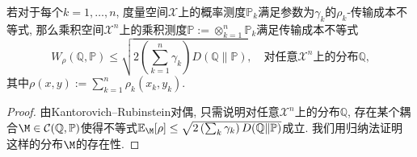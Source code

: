 \begin{proposition}[传输成本不等式的张量化]\label{thm:TensorizationForTransportationCost}
	若对于每个$k = 1, \dots, n$, 度量空间$\mathcal{X}$上的概率测度$\mathbb{P}_k$满足参数为$\gamma_k$的$\rho_k$-传输成本不等式, 那么乘积空间$\mathcal{X}^n$上的乘积测度$\mathbb{P} := \otimes_{k=1}^n \mathbb{P}_k$满足传输成本不等式
	\begin{equation}
		W_{\rho}(\mathbb{Q}, \mathbb{P})
		\leq \sqrt{2 \left(\sum_{k=1}^n \gamma_k \right) D(\mathbb{Q} \| \mathbb{P})}, \quad \text{对任意$\mathcal{X}^n$上的分布$\mathbb{Q}$,}
	\end{equation}
	其中$\rho(x, y) := \sum_{k=1}^n \rho_k(x_k, y_k)$. 
\end{proposition}
\begin{proof}
	由Kantorovich–Rubinstein对偶, 只需说明对任意$\mathcal{X}^n$上的分布$\mathbb{Q}$, 存在某个耦合$\M \in \mathcal{C}(\mathbb{Q}, \mathbb{P})$使得不等式$\mathbb{E}_{\M}[\rho] \leq \sqrt{2 \left(\sum_k \gamma_k \right) D(\mathbb{Q} \| \mathbb{P})}$成立. 
	我们用归纳法证明这样的分布$\M$的存在性. 
	

\end{proof}
